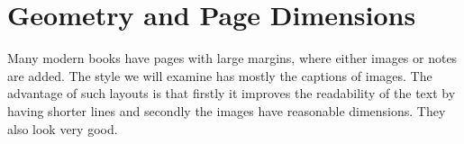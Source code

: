 \def\asidecaption{\parbox{\marginparwidth}{{\bfseries Image \thefigure}\par\lorem}%
  \addtocontents{lof}{This is image 8}
}

\def\ps@caption{%
     \let\@oddfoot\@empty\let\@evenfoot\@empty%
     \edef\leftx{-\marginparwidth-\marginparsep}
    \def\@evenhead{%
           \begin{picture}(0,0)%
           \put(-\marginparwidth-\marginparsep,-\headheight-\topsep-5pt){ \line(1, 0){\marginparwidth}}%
           \put(-\marginparwidth-\marginparsep,-\headheight-\headsep){ \line(1, 0){\marginparwidth}}%
            \put(\leftx,-90){\asidecaption\par}%
            \stepcounter{figure}%
           \put(\leftx,-370){\asidecaption}%
        \end{picture}%
      }%
    \let\@oddhead\@evenhead%
    \let\@mkboth\@gobbletwo%
    \let\chaptermark\@gobble%
    \let\sectionmark\@gobble%
 }

\def\ps@bigpicture{%
    \setlength\headheight{19cm}%
    \let\@oddfoot\@empty\let\@evenfoot\@empty%
    \def\@evenhead{%
         \begin{picture}(0,0)%
          \put(-149,0){\texttt{[image: stuartpearson]}}%
         \end{picture}%
      }%
    \let\@oddhead\@evenhead%
    \let\@mkboth\@gobbletwo%
    \let\chaptermark\@gobble%
    \let\sectionmark\@gobble%
 }


\def\doubletakeimage{%
  \renewcommand{\topfraction}{.95}%
  \begin{figure}[t]
      \texttt{[image: matron]}%
       \thispagestyle{caption}
  \end{figure}

  \begin{figure}[tp]
   \hspace*{-\marginparwidth}\texttt{[image: stuartpearson]}
 \end{figure}
}



\chapter{Geometry and Page Dimensions}

Many modern books have pages with large margins, where either images or notes are added. The style we will
examine has mostly the captions of images. The advantage of such layouts is that firstly it improves the readability of the text by having shorter lines and secondly the images have reasonable dimensions. They also look very
good.

